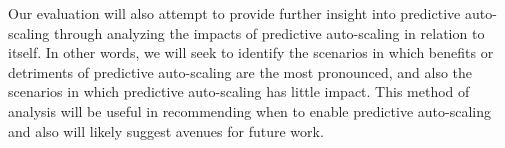 Our evaluation will also attempt to provide further insight into predictive auto-scaling
through analyzing the impacts of predictive auto-scaling in relation to itself.
In other words, we will seek to identify the scenarios in which benefits or
detriments of predictive auto-scaling are the most pronounced, and also the
scenarios in which predictive auto-scaling has little impact. This method of
analysis will be useful in recommending when to enable predictive auto-scaling
and also will likely suggest avenues for future work.

